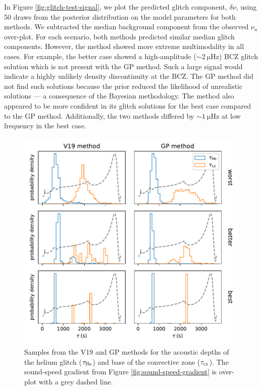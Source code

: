 In Figure \ref{fig:glitch-test-signal}, we plot the predicted glitch component, \(\delta\nu\), using 50 draws from the posterior distribution on the model parameters for both methods. We subtracted the median background component from the observed \(\nu_n\) over-plot. For each scenario, both methods predicted similar median glitch components. However, the  method showed more extreme multimodality in all cases. For example, the better case showed a high-amplitude (\(\sim \SI{2}{\micro\hertz}\)) BCZ glitch solution which is not present with the GP method. Such a large signal would indicate a highly unlikely density discontinuity at the BCZ. The GP method did not find such solutions because the prior reduced the likelihood of unrealistic solutions --- a consequence of the Bayesian methodology. The  method also appeared to be more confident in its glitch solutions for the best case compared to the GP method. Additionally, the two methods differed by \(\sim \SI{1}{\micro\hertz}\) at low frequency in the best case.

\begin{figure}
    \centering
    \includegraphics{figures/glitch-test-tau.pdf}
    \caption{Samples from the V19 and GP methods for the acoustic depths of the helium glitch (\(\tau_{{\mathrm{He}}}\)) and base of the convective zone (\(\tau_{{\mathrm{cz}}}\)). The sound-speed gradient from Figure \ref{fig:sound-speed-gradient} is over-plot with a grey dashed line.}
    \label{fig:glitch-test-tau}
\end{figure}


